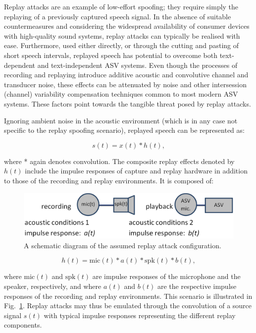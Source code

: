 Replay attacks are an example of low-effort spoofing; they require simply the replaying of a previously captured speech signal.  
In the absence of suitable countermeasures and considering the widespread availability of consumer devices with high-quality sound systems, replay attacks can typically be realised with ease.  Furthermore, used either directly, or through the cutting and pasting of short speech intervals, replayed speech has potential to overcome both text-dependent and text-independent ASV systems.  Even though the processes of recording and replaying introduce additive acoustic and convolutive channel and transducer noise, these effects can be attenuated by noise and other intersession (channel) variability compensation techniques common to most modern ASV systems.  These factors point towards the tangible threat posed by replay attacks.

Ignoring ambient noise in the acoustic environment (which is in any case not specific to the replay spoofing scenario), replayed speech can be represented as:


\begin{equation}
s(t) = x(t)*h(t),
\label{eq:replay}
\end{equation}


\noindent where * again denotes convolution.  The composite replay effects denoted by $h(t)$ include the impulse responses of capture and replay hardware in addition to those of the recording and replay environments.  It is composed of:


\begin{figure}
	\includegraphics[width=1\linewidth]{Figs/replay.png}
	\caption{A schematic diagram of the assumed replay attack configuration. %
}
	\label{fig::Replay}
\end{figure}

\begin{equation}
h(t) = \mathrm{mic}(t) * a(t) * \mathrm{spk}(t) * b(t),
\label{eq::playback}
\end{equation}


\noindent where $\mathrm{mic}(t)$ and $\mathrm{spk}(t)$ are impulse responses of the microphone and the speaker, respectively, and where $a(t)$ and $b(t)$ are the respective impulse responses of the recording and replay environments.  This scenario is illustrated in Fig.~\ref{fig::Replay}.  Replay attacks may thus be emulated through the convolution of a source signal $s(t)$ with typical impulse responses representing the different replay components.

